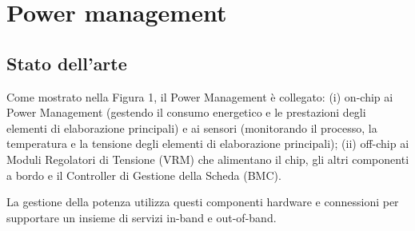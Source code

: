 \chapter{Power management}

\section{Stato dell'arte}

Come mostrato nella Figura 1, il Power Management è collegato: (i) on-chip ai Power Management (gestendo il consumo energetico e le prestazioni degli elementi di elaborazione principali) e ai sensori (monitorando il processo, la temperatura e la tensione degli elementi di elaborazione principali); (ii) off-chip ai Moduli Regolatori di Tensione (VRM) che alimentano il chip, gli altri componenti a bordo e il Controller di Gestione della Scheda (BMC).

La gestione della potenza utilizza questi componenti hardware e connessioni per supportare un insieme di servizi in-band e out-of-band.

